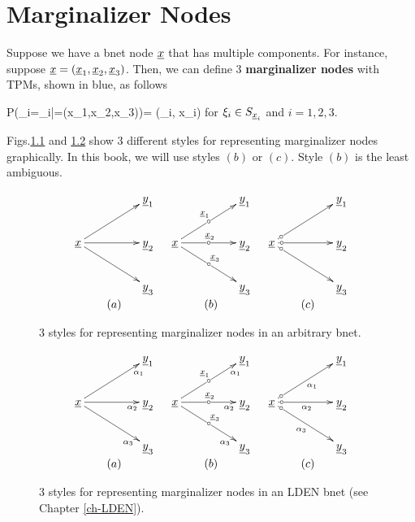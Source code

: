 \chapter{Marginalizer Nodes}
\label{ch-marginalizer}

Suppose we have a bnet node $\rvx$
that has multiple components.
For instance, suppose
$\rvx=(\rvx_1, \rvx_2, \rvx_3)$.
Then, we can define 
3 {\bf marginalizer nodes}
with TPMs, shown in blue, as follows

\beq\color{blue}
P(\rvx_i=\xi_i|\rvx=(x_1,x_2,x_3))= \delta(\xi_i, x_i)
\eeq
for $\xi_i\in S_{\rvx_i}$
and $i=1,2,3$.

Figs.\ref{fig-marginalizer}
and \ref{fig-marginalizer-lden}
show 3 different
styles for representing
marginalizer nodes graphically.
In this book,
we will use styles $(b)$ or $(c)$.
Style $(b)$ is the least 
ambiguous.

\begin{figure}[h!]
$$
\begin{array}{ccc}
\xymatrix@C=4pc{
&\rvy_1
\\
\rvx\ar[ru]
\ar[r]
\ar[rd]
&\rvy_2
\\
&\rvy_3
}
&
\xymatrix@C=4pc{
&\rvy_1
\\
\rvx\ar[ru]|-\circ^{\rvx_1}
\ar[r]|-\circ^{\rvx_2}
\ar[rd]|-\circ^{\rvx_3}
&\rvy_2
\\
&\rvy_3
}
&
\xymatrix@C=4pc{
&\rvy_1
\\
\rvx\ar[ru]|-<\circ
\ar[r]|-<\circ
\ar[rd]|-<\circ
&\rvy_2
\\
&\rvy_3
}
\\
(a)&(b)&(c)
\end{array}
$$
\caption{3 styles
for representing marginalizer nodes
in an arbitrary bnet.}
\label{fig-marginalizer}
\end{figure}


\begin{figure}[h!]
$$
\begin{array}{ccc}
\xymatrix@C=4pc{
&\rvy_1
\\
\rvx\ar[ru]_>>>{\alpha_1}
\ar[r]_>>>{\alpha_2}
\ar[rd]_>>>{\alpha_3}
&\rvy_2
\\
&\rvy_3
}
&
\xymatrix@C=4pc{
&\rvy_1
\\
\rvx\ar[ru]_>>>{\alpha_1}|-\circ^{\rvx_1}
\ar[r]_>>>{\alpha_2}|-\circ^{\rvx_2}
\ar[rd]_>>>{\alpha_3}|-\circ^{\rvx_3}
&\rvy_2
\\
&\rvy_3
}
&
\xymatrix@C=4pc{
&\rvy_1
\\
\rvx\ar[ru]_{\alpha_1}|-<\circ
\ar[r]_{\alpha_2}|-<\circ
\ar[rd]_{\alpha_3}|-<\circ
&\rvy_2
\\
&\rvy_3
}
\\
(a)&(b)&(c)
\end{array}
$$
\caption{3 styles
for representing marginalizer nodes
in an LDEN bnet (see Chapter \ref{ch-LDEN}).}
\label{fig-marginalizer-lden}
\end{figure}

